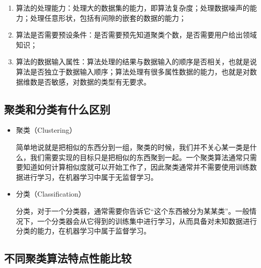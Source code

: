 \begin{enumerate}\itemsep0em 
		\item 算法的处理能力：处理大的数据集的能力，即算法复杂度；处理数据噪声的能力；处理任意形状，包括有间隙的嵌套的数据的能力； 
		\item 算法是否需要预设条件：是否需要预先知道聚类个数，是否需要用户给出领域知识； 
		\item 算法的数据输入属性：算法处理的结果与数据输入的顺序是否相关，也就是说算法是否独立于数据输入顺序；算法处理有很多属性数据的能力，也就是对数据维数是否敏感，对数据的类型有无要求。
\end{enumerate}

\subsection{聚类和分类有什么区别}

\begin{itemize}\itemsep0em 
\item 聚类（Clustering）

简单地说就是把相似的东西分到一组，聚类的时候，我们并不关心某一类是什么，我们需要实现的目标只是把相似的东西聚到一起。一个聚类算法通常只需要知道如何计算相似度就可以开始工作了，因此聚类通常并不需要使用训练数据进行学习，在机器学习中属于无监督学习。 

\item 分类（Classification）

分类，对于一个分类器，通常需要你告诉它“这个东西被分为某某类”。一般情况下，一个分类器会从它得到的训练集中进行学习，从而具备对未知数据进行分类的能力，在机器学习中属于监督学习。
\end{itemize}


\subsection{不同聚类算法特点性能比较}

